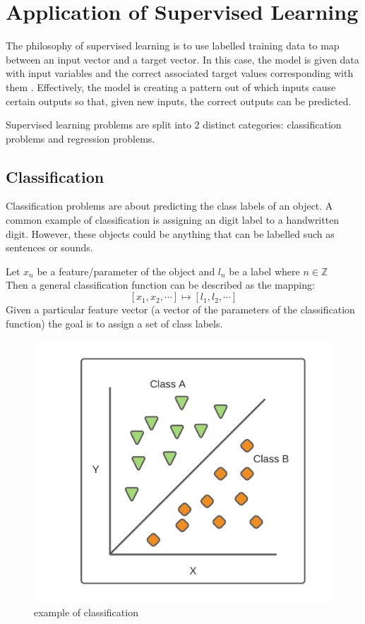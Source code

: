 \documentclass[10pt,a4paper]{report}
\begin{document}
		\section{Application of Supervised Learning}
			The philosophy of supervised learning is to use labelled training data to map between
			an input vector and a target vector. In this case, the model is given
			data with input variables and the correct associated target values corresponding with them \autocite[p. 105]{DeepLearning}.
			Effectively, the model is creating a pattern out of which inputs cause certain outputs so that,
			given new inputs, the correct outputs can be predicted. \par
			Supervised learning problems are split into 2 distinct categories: classification problems and regression problems.

			\subsection{Classification}
				Classification problems are about predicting the class labels of an object. A common example
				of classification is assigning an digit label to a handwritten digit. However, these objects
				could be anything that can be labelled such as sentences or sounds. \par
				Let $x_n$ be a feature/parameter of the object and $l_n$ be a label where $n \in \mathbb{Z}$\\
				Then a general classification function can be described as the mapping: \[[x_1,x_2,\cdots] \mapsto [l_1,l_2,\cdots]\]
				Given a particular feature vector (a vector of the parameters of the classification function) the goal is to assign a set of class labels.
				\begin{figure}[h]
					\centering
					\includegraphics[scale=0.5]{classification-diagram.png}
					\caption{example of classification}
					\label{fig:classifcation}
				\end{figure}
\end{document}
